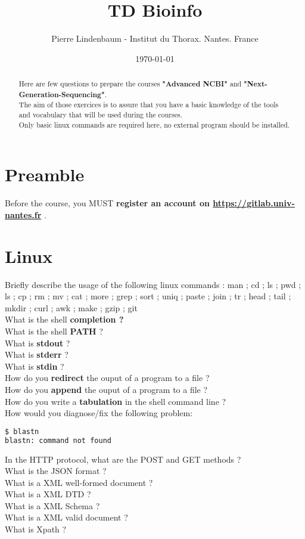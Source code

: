 \documentclass{article}
\title{TD Bioinfo}
\author{Pierre Lindenbaum - Institut du Thorax. Nantes. France}
\date{\today}
\begin{document}
\maketitle
\begin{abstract}
Here are few questions to prepare the courses \textbf{"Advanced NCBI"} and \textbf{"Next-Generation-Sequencing"}.\\
The aim of those exercices is to assure that you have a basic knowledge of the tools and vocabulary that will be used during the courses.\\
Only basic linux commands are required here, no external program should be installed.
\end{abstract}

\section{Preamble}
Before the course, you MUST \textbf{register an account  on \url{https://gitlab.univ-nantes.fr} } .

\section{Linux}
Briefly describe the usage of the following linux commands : man ;
cd ;
ls ;
pwd ;
ls ;
cp ;
rm ;
mv ;
cat ;
more ;
grep ;
sort ;
uniq ;
paste ;
join ;
tr ;
head ;
tail ;
mkdir ;
curl ;
awk ;
make ;
gzip ;
git\\

\noindent
What is 	the shell \textbf{completion ?} \\
What is 	the shell \textbf{PATH} ? \\
What is 	\textbf{stdout} ? \\
What is 	\textbf{stderr} ?\\
What is 	\textbf{stdin} ?\\
How do you 	\textbf{redirect} the ouput of a program to a file ?\\
How do you 	\textbf{append} the ouput of a program to a file ?\\
How do you 	write a \textbf{tabulation} in the shell command line ?\\
How would you diagnose/fix the following problem:

\begin{lstlisting}[language=bash]
$ blastn
blastn: command not found
\end{lstlisting}

In the HTTP protocol, what are the POST and GET methods ?\\
What is the JSON format ?\\
What is a XML well-formed document ?\\
What is a XML DTD ?\\
What is a XML Schema ?\\
What is a XML valid document ?\\
What is Xpath ?\\
\end{document}
